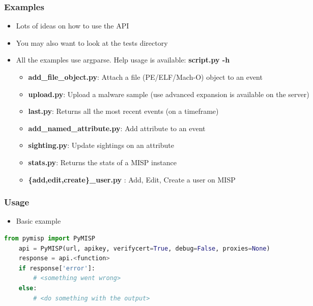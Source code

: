 \begin{frame}[fragile]
	\frametitle{Examples}
	\begin{itemize}
		\item Lots of ideas on how to use the API
		\item You may also want to look at the tests directory
		\item All the examples use argparse. Help usage is available: {\bf script.py -h}
		\begin{itemize}
			\item {\bf add\_file\_object.py}: Attach a file (PE/ELF/Mach-O) object to an event
			\item {\bf upload.py}: Upload a malware sample (use advanced expansion is available on the server)
			\item {\bf last.py}: Returns all the most recent events (on a timeframe)
			\item {\bf add\_named\_attribute.py}: Add attribute to an event
			\item {\bf sighting.py}: Update sightings on an attribute
			\item {\bf stats.py}: Returns the stats of a MISP instance
			\item {\bf \{add,edit,create\}\_user.py} : Add, Edit, Create a user on MISP
		\end{itemize}
	\end{itemize}
\end{frame}

\begin{frame}[fragile]
	\frametitle{Usage}
	\begin{itemize}
		\item Basic example
	\end{itemize}
		\begin{adjustbox}{width=\textwidth,height=2cm,keepaspectratio}
			\begin{lstlisting}[language=python,firstnumber=1]
	from pymisp import PyMISP
	api = PyMISP(url, apikey, verifycert=True, debug=False, proxies=None)
	response = api.<function>
	if response['error']:
		# <something went wrong>
	else:
		# <do something with the output>
			\end{lstlisting}
		\end{adjustbox}
\end{frame}


